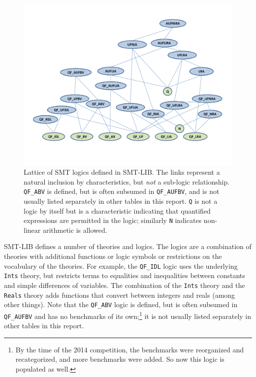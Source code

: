 \documentclass[smallcondensed]{svjour3}
\begin{document}
\begin{figure}
\centering
\includegraphics[width=\textwidth]{LogicLatticeN}
\caption{Lattice of SMT logics defined in SMT-LIB. The links represent a natural inclusion by characteristics, but {\it not} a sub-logic relationship. {\tt QF\_ABV} is defined, but is often subsumed in {\tt QF\_AUFBV}, and is not usually listed separately in other tables in this report. {\tt Q} is not a logic by itself but is a characteristic indicating that quantified expressions are permitted in the logic; similarly {\tt N} indicates non-linear arithmetic is allowed.}
\label{Fig:lattice}
\end{figure}

SMT-LIB defines a number of theories and logics. The logics are a combination of theories with additional functions or logic symbols or restrictions on the vocabulary of the theories. For example, the {\tt QF\_IDL} logic uses the underlying {\tt Ints} theory, but restricts terms to equalities and inequalities between constants and simple differences of variables.
The combination of the {\tt Ints} theory and the {\tt Reals} theory adds functions that convert between integers and reals (among other things). 
Note that the {\tt QF\_ABV} logic is defined, but is often subsumed in {\tt QF\_AUFBV} and has no benchmarks of its own;\footnote{By the time of the 2014 competition, the benchmarks were reorganized and recategorized, and more benchmarks were added. So now this logic is populated as well.} it is not usually listed separately in other tables in this report.
\end{document}
